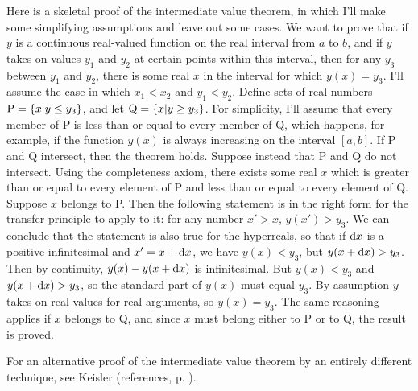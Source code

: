 Here is a skeletal proof of the intermediate value theorem, in which I'll make some simplifying
assumptions and leave out some cases. We want to prove that if $y$ is a continuous real-valued function on the real interval from $a$ to $b$,
and if $y$ takes on values $y_1$ and $y_2$ at certain points within this interval, then for any $y_3$ between $y_1$ and
$y_2$, there is some real $x$ in the interval for which $y(x)=y_3$.
I'll assume the case in which $x_1<x_2$ and $y_1<y_2$.
Define sets of real numbers $\textup{P}=\{x|y \le y_3\}$, and let $\textup{Q}=\{x|y \ge y_3\}$.
For simplicity, I'll assume that every member of P is less than or equal to
every member of Q, which happens, for example, if the function $y(x)$ is always increasing
on the interval $[a,b]$. If P and Q intersect, then the theorem holds.
Suppose instead that P and Q do not intersect.
Using the completeness axiom, there exists some real $x$ which is greater than or equal
to every element of P and less than or equal to every element of Q.
Suppose $x$ belongs to P.
Then the following
statement is in the right form for the transfer principle to apply to it: for any number
$x'>x$, $y(x')>y_3$. We can conclude that the statement is also true for the hyperreals,
so that if $\textup{d} x$ is a positive infinitesimal and $x'=x+\textup{d} x$, we have $y(x)<y_3$, but $y(x+\textup{d} x)>y_3$.
Then by continuity, $y(x)-y(x+\textup{d} x)$ is infinitesimal. But $y(x)<y_3$ and
$y(x+\textup{d} x)>y_3$, so the standard part of $y(x)$ must equal $y_3$. By assumption $y$ takes on real values
for real arguments, so $y(x)=y_3$. The same reasoning applies if $x$ belongs to Q, and since
$x$ must belong either to P or to Q, the result is proved.

For an alternative proof of the
intermediate value theorem by an entirely different technique, see Keisler (references, p. \pageref{references}).

